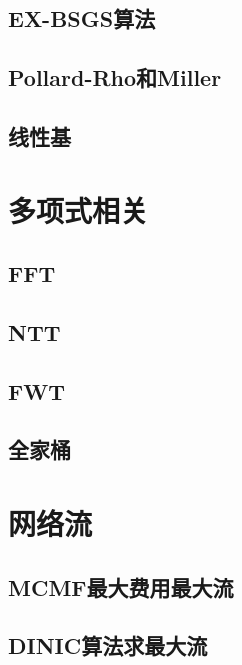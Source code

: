 \documentclass[a4paper,12pt]{article}
\begin{document}
\subsection{EX-BSGS算法}

\subsection{Pollard-Rho和Miller}

\subsection{线性基}




\section{多项式相关}

\subsection{FFT}

\subsection{NTT}

\subsection{FWT}

\subsection{全家桶}


\section{网络流}

\subsection{MCMF最大费用最大流}

\subsection{DINIC算法求最大流}

\end{document}

